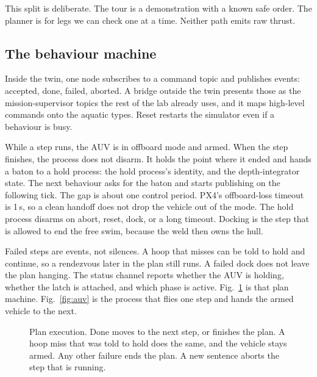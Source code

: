 \documentclass[conference]{IEEEtran}
\begin{document}
This split is deliberate. The tour is a demonstration with a known safe order. The planner is for legs we can check one at a time. Neither path emits raw thrust.

\subsection{The behaviour machine}
Inside the twin, one node subscribes to a command topic and publishes events: accepted, done, failed, aborted. A bridge outside the twin presents those as the mission-supervisor topics the rest of the lab already uses, and it maps high-level commands onto the aquatic types. Reset restarts the simulator even if a behaviour is busy.

While a step runs, the AUV is in offboard mode and armed. When the step finishes, the process does not disarm. It holds the point where it ended and hands a baton to a hold process: the hold process's identity, and the depth-integrator state. The next behaviour asks for the baton and starts publishing on the following tick. The gap is about one control period. PX4's offboard-loss timeout is 1\,s, so a clean handoff does not drop the vehicle out of the mode. The hold process disarms on abort, reset, dock, or a long timeout. Docking is the step that is allowed to end the free swim, because the weld then owns the hull.

Failed steps are events, not silences. A hoop that misses can be told to hold and continue, so a rendezvous later in the plan still runs. A failed dock does not leave the plan hanging. The status channel reports whether the AUV is holding, whether the latch is attached, and which phase is active. Fig.~\ref{fig:plan} is that plan machine. Fig.~\ref{fig:auv} is the process that flies one step and hands the armed vehicle to the next.

\begin{figure}[t]
\centering
{}
\caption{Plan execution. Done moves to the next step, or finishes the plan. A hoop miss that was told to hold does the same, and the vehicle stays armed. Any other failure ends the plan. A new sentence aborts the step that is running.}
\label{fig:plan}
\end{figure}
\end{document}
